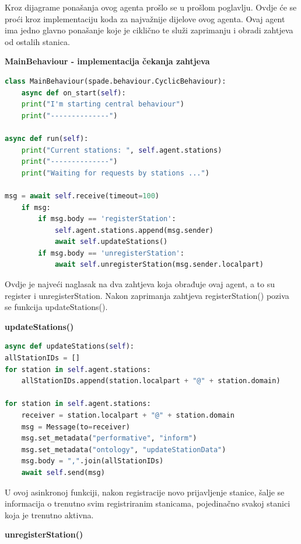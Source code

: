 \documentclass{foi}
\begin{document}
Kroz dijagrame ponašanja ovog agenta prošlo se u prošlom poglavlju. Ovdje će se proći kroz implementaciju koda za najvažnije dijelove ovog agenta. Ovaj agent ima jedno glavno ponašanje koje je ciklično te služi zaprimanju i obradi zahtjeva od ostalih stanica.

\begin{flushleft}\textbf{MainBehaviour - implementacija čekanja zahtjeva}\end{flushleft}

\begin{lstlisting}[language=Python]
class MainBehaviour(spade.behaviour.CyclicBehaviour):
	async def on_start(self):
	print("I'm starting central behaviour")
	print("--------------")

async def run(self):
	print("Current stations: ", self.agent.stations)
	print("--------------")
	print("Waiting for requests by stations ...")

msg = await self.receive(timeout=100)
	if msg:
		if msg.body == 'registerStation':
			self.agent.stations.append(msg.sender)
			await self.updateStations()
		if msg.body == 'unregisterStation':
			await self.unregisterStation(msg.sender.localpart)
\end{lstlisting}

Ovdje je najveći naglasak na dva zahtjeva koja obrađuje ovaj agent, a to su register i unregisterStation. Nakon zaprimanja zahtjeva registerStation() poziva se funkcija updateStations().

\begin{flushleft}\textbf{updateStations()}\end{flushleft}

\begin{lstlisting}[language=Python]
async def updateStations(self):
allStationIDs = []
for station in self.agent.stations:
	allStationIDs.append(station.localpart + "@" + station.domain)

for station in self.agent.stations:
	receiver = station.localpart + "@" + station.domain
	msg = Message(to=receiver)
	msg.set_metadata("performative", "inform")
	msg.set_metadata("ontology", "updateStationData")
	msg.body = ",".join(allStationIDs)
	await self.send(msg)
\end{lstlisting}

U ovoj asinkronoj funkciji, nakon registracije novo prijavljenje stanice, šalje se informacija o trenutno svim registriranim stanicama, pojedinačno svakoj stanici koja je trenutno aktivna.

\begin{flushleft}\textbf{unregisterStation()}\end{flushleft}
\end{document}
